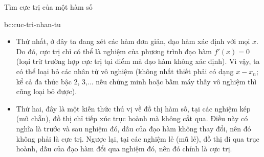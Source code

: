 \begin{lythuyetbox}{Tìm cực trị của một hàm số}
\begin{banchat}{}{bc:cuc-tri-nhan-tu}
\begin{itemize}
    \item Thứ nhất, ở đây ta đang xét các hàm đơn giản, đạo hàm xác định với mọi $x$. Do đó, cực trị chỉ có thể là nghiệm của phương trình đạo hàm $f'(x) = 0$ (loại trừ trường hợp cực trị tại điểm mà đạo hàm không xác định). Vì vậy, ta có thể loại bỏ các nhân tử vô nghiệm (không nhất thiết phải có dạng $x-x_n$; kể cả đa thức bậc 2, 3,... nếu chứng minh hoặc bấm máy thấy vô nghiệm thì cũng loại bỏ được).
    \item Thứ hai, đây là một kiến thức thú vị về đồ thị hàm số, tại các nghiệm kép (mũ chẵn), đồ thị chỉ tiếp xúc trục hoành mà không cắt qua. Điều này có nghĩa là trước và sau nghiệm đó, dấu của đạo hàm không thay đổi, nên đó không phải là cực trị. Ngược lại, tại các nghiệm lẻ (mũ lẻ), đồ thị đi qua trục hoành, dấu của đạo hàm đổi qua nghiệm đó, nên đó chính là cực trị.
\end{itemize}
\begin{center}
\end{center}
\end{banchat}

\end{lythuyetbox}

